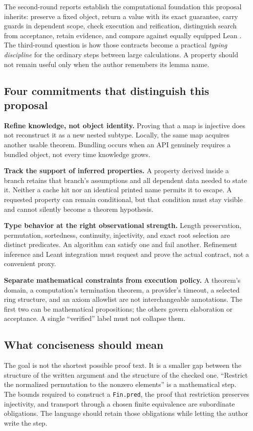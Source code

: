 \documentclass[11pt,letterpaper]{article}
\newcommand{\code}[1]{\nolinkurl{#1}}
\theoremstyle{remark}
\begin{document}
The second-round reports establish the computational foundation this proposal
inherits: preserve a fixed object, return a value with its exact guarantee,
carry guards in dependent scope, check execution and reification, distinguish
search from acceptance, retain evidence, and compare against equally equipped
Lean \cite{syn,workbenches}. The third-round question is how those contracts
become a practical \emph{typing discipline} for the ordinary steps between
large calculations. A property should not remain useful only when the author
remembers its lemma name.

\subsection{Four commitments that distinguish this proposal}

\textbf{Refine knowledge, not object identity.} Proving that a map is
injective does not reconstruct it as a new nested subtype. Locally, the same
map acquires another usable theorem. Bundling occurs when an API genuinely
requires a bundled object, not every time knowledge grows.

\textbf{Track the support of inferred properties.} A property derived inside a
branch retains that branch's assumptions and all dependent data needed to state
it. Neither a cache hit nor an identical printed name permits it to escape.
A requested property can remain conditional, but that condition must stay visible
and cannot silently become a theorem hypothesis.

\textbf{Type behavior at the right observational strength.} Length
preservation, permutation, sortedness, continuity, injectivity, and exact
root selection are distinct predicates. An algorithm can satisfy one and fail
another. Refinement inference and Leant integration must request and prove the
actual contract, not a convenient proxy.

\textbf{Separate mathematical constraints from execution policy.} A theorem's
domain, a computation's termination theorem, a provider's timeout, a selected
ring structure, and an axiom allowlist are not interchangeable annotations.
The first two can be mathematical propositions; the others govern elaboration
or acceptance. A single ``verified'' label must not collapse them.

\subsection{What conciseness should mean}
The goal is not the shortest possible proof text. It is a smaller gap between
the structure of the written argument and the structure of the checked one.
``Restrict the normalized permutation to the nonzero elements'' is a
mathematical step. The bounds required to construct a \code{Fin.pred}, the
proof that restriction preserves injectivity, and transport through a chosen
finite equivalence are subordinate obligations. The language should retain
those obligations while letting the author write the step.
\end{document}
